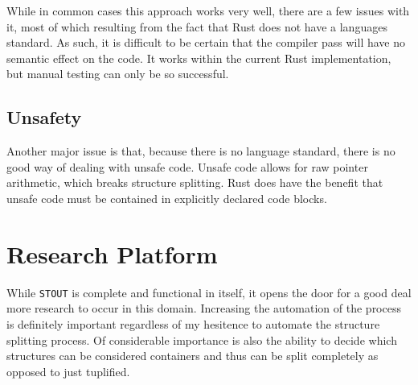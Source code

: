 \documentclass[prodmode,acmtecs]{acmsmall} %
\newcommand{\projectname}{{\texttt{STOUT}}}
\def \name{\projectname\xspace}
\begin{document}
While in common cases this approach works very well, there are a few issues with
it, most of which resulting from the fact that Rust does not have a languages
standard. As such, it is difficult to be certain that the compiler pass will
have no semantic effect on the code. It works within the current Rust
implementation, but manual testing can only be so successful.


\subsection{Unsafety}
\label{sec:unsafe}


Another major issue is that, because there is no language standard, there is no
good way of dealing with unsafe code. Unsafe code allows for raw pointer
arithmetic, which breaks structure splitting. Rust does have the benefit that
unsafe code must be contained in explicitly declared code blocks.

\section{Research Platform}

While \name is complete and functional in itself, it opens the door for 
a good deal more research to occur in this domain. Increasing the automation
of the process is definitely important regardless of my hesitence to automate
the structure splitting process. Of considerable importance is also
the ability to decide which structures can be considered containers and thus 
can be split completely as opposed to just tuplified.




\end{document}
